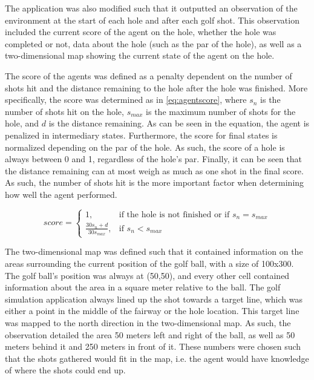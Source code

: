 \documentclass{kththesis}
\begin{document}
The application was also modified such that it outputted an observation of the environment at the start of each hole and after each golf shot. This observation included the current score of the agent on the hole, whether the hole was completed or not, data about the hole (such as the par of the hole), as well as a two-dimensional map showing the current state of the agent on the hole.

The score of the agents was defined as a penalty dependent on the number of shots hit and the distance remaining to the hole after the hole was finished. More specifically, the score was determined as in \autoref{eq:agentscore}, where $s_n$ is the number of shots hit on the hole, $s_{max}$ is the maximum number of shots for the hole, and $d$ is the distance remaining. As can be seen in the equation, the agent is penalized in intermediary states. Furthermore, the score for final states is normalized depending on the par of the hole. As such, the score of a hole is always between 0 and 1, regardless of the hole's par. Finally, it can be seen that the distance remaining can at most weigh as much as one shot in the final score. As such, the number of shots hit is the more important factor when determining how well the agent performed. 

\begin{equation}
\label{eq:agentscore}
score = 
\begin{cases}
1,& \text{if the hole is not finished or if } s_n = s_{max}\\
\frac{30s_n + d}{30s_{max}},& \text{if } s_n < s_{max}
\end{cases}
\end{equation}

The two-dimensional map was defined such that it contained information on the areas surrounding the current position of the golf ball, with a size of 100x300. The golf ball's position was always at (50,50), and every other cell contained information about the area in a square meter relative to the ball. The golf simulation application always lined up the shot towards a target line, which was either a point in the middle of the fairway or the hole location. This target line was mapped to the north direction in the two-dimensional map. As such, the observation detailed the area 50 meters left and right of the ball, as well as 50 meters behind it and 250 meters in front of it. These numbers were chosen such that the shots gathered would fit in the map, i.e. the agent would have knowledge of where the shots could end up. 
\end{document}
